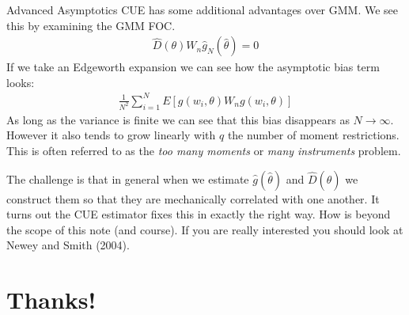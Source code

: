 \documentclass[aspectratio=169]{beamer}
\begin{document}
\begin{frame}{Advanced Asymptotics}
\small
CUE has some additional advantages over GMM. We see this by examining the GMM FOC. 
\begin{eqnarray*}
\hat{D}(\theta) W_n \hat{g}_N(\hat{\theta}) =0
\end{eqnarray*}
If we take an Edgeworth expansion we can see how the  \alert{asymptotic bias} term looks:
\begin{eqnarray*}
\frac{1}{N^2}\sum_{i=1}^N E[g(w_i,\theta) W_n g(w_i,\theta)]
\end{eqnarray*}
As long as the variance is finite we can see that this bias disappears as $N \rightarrow \infty$. However it also tends to grow linearly with $q$ the number of moment restrictions. This is often referred to as the \textit{too many moments} or \textit{many instruments} problem.

The challenge is that in general when we estimate $\hat{g}(\hat{\theta})$ and $\hat{D}(\hat{\theta})$ we construct them so that they are mechanically correlated with one another. It turns out the CUE estimator fixes this in exactly the right way. How is beyond the scope of this note (and course). If you are really interested you should look at Newey and Smith (2004).

\end{frame}
\section*{Thanks!}
\end{document}
